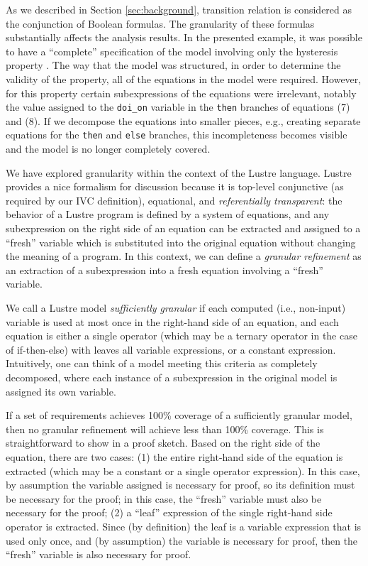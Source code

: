 As we described in Section \ref{sec:background}, transition relation is considered
as the conjunction of Boolean formulas. The granularity of these formulas substantially affects the analysis results.  In the presented example, it was possible to have a ``complete'' specification of the model involving only the hysteresis property \hystp.  The way that the model was structured, in order to determine the validity of the property, all of the equations in the model were required.  However, for this property certain subexpressions of the equations were irrelevant, notably the value assigned to the \texttt{doi\_on} variable in the \texttt{then} branches of equations (7) and (8).  If we decompose the equations into smaller pieces, e.g., creating separate equations for the \texttt{then} and \texttt{else} branches, this incompleteness becomes visible and the model is no longer completely covered.



%
We have explored granularity within the context of the Lustre language.  Lustre provides a nice formalism for discussion because it is top-level conjunctive (as required by our IVC definition), equational, and {\em referentially transparent}: the behavior of a Lustre program is defined by a system of equations, and any subexpression on the right side of an equation can be extracted and assigned to a ``fresh'' variable which is substituted into the original equation without changing the meaning of a program.  In this context, we can define a {\em granular refinement} as an extraction of a subexpression into a fresh equation involving a ``fresh'' variable.

We call a Lustre model {\em sufficiently granular} if each computed (i.e., non-input) variable is used at most once in the right-hand side of an equation, and each equation is either a single operator (which may be a ternary operator in the case of if-then-else) with leaves all variable expressions, or a constant expression.  Intuitively, one can think of a model meeting this criteria as completely decomposed, where each instance of a subexpression in the original model is assigned its own variable.  

If a set of requirements achieves 100\% coverage of a sufficiently granular model, then no granular refinement will achieve less than 100\% coverage.  This is straightforward to show in a proof sketch.  Based on the right side of the equation, there are two cases: (1) the entire right-hand side of the equation is extracted (which may be a constant or a single operator expression). In this case, by assumption the variable assigned is necessary for proof, so its definition must be necessary for the proof; in this case, the ``fresh'' variable must also be necessary for the proof; (2) a ``leaf'' expression of the single right-hand side operator is extracted.  Since (by definition) the leaf is a variable expression that is used only once, and (by assumption) the variable is necessary for proof, then the ``fresh'' variable is also necessary for proof.

